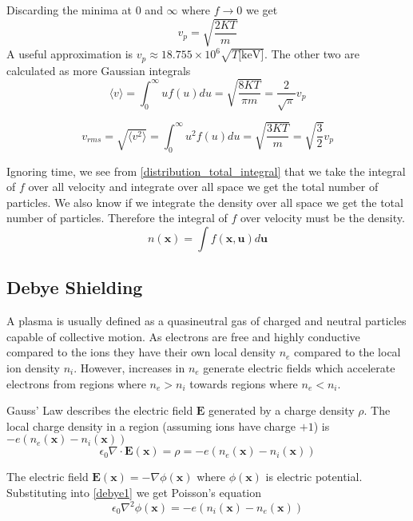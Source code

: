 Discarding the minima at 0 and $\infty$ where $f \rightarrow 0$ we get
\begin{equation}
	v_p=\sqrt{\frac{2KT}{m}}
\end{equation}
A useful approximation is $v_p \approx 18.755 \times 10^6 \sqrt{T\text{[keV]}}$. The other two are calculated as more Gaussian integrals
\begin{equation}
	\langle v \rangle = \int_{0}^{\infty}uf(u)du=\sqrt{\frac{8KT}{\pi m}} = \frac{2}{\sqrt{\pi}}v_p
\end{equation}

\begin{equation}
	v_{rms} = \sqrt{\langle v^2 \rangle} = \int_{0}^{\infty}u^2f(u)du = \sqrt{\frac{3KT}{m}} = \sqrt{\frac{3}{2}}v_p
\end{equation}

Ignoring time, we see from \eqref{distribution_total_integral} that we take the integral of $f$ over all velocity and integrate over all space we get the total number of particles. We also know if we integrate the density over all space we get the total number of particles. Therefore the integral of $f$ over velocity must be the density.
\begin{equation}
	n(\bm{x}) = \int f(\bm{x}, \bm{u}) d\bm{u}
\end{equation}

\subsection{Debye Shielding}
A plasma is usually defined as a quasineutral gas of charged and neutral particles capable of collective motion. As electrons are free and highly conductive compared to the ions they have their own local density $n_e$ compared to the local ion density $n_i$. However, increases in $n_e$ generate electric fields which accelerate electrons from regions where $n_e > n_i$ towards regions where $n_e < n_i$.

Gauss' Law describes the electric field $\textbf{E}$ generated by a charge density $\rho$. The local charge density in a region (assuming ions have charge $+1$) is $-e(n_e(\textbf{x})-n_i(\textbf{x}))$
\begin{equation}\label{debye1}
	\epsilon_0\nabla\cdot\bm{E}(\bm{x}) = \rho = -e(n_e(\bm{x})-n_i(\bm{x}))
\end{equation}

The electric field $\textbf{E}(\textbf{x})=-\nabla \phi(\textbf{x})$ where $\phi(\textbf{x})$ is electric potential. Substituting into \eqref{debye1} we get Poisson's equation
\begin{equation}\label{debye2}
	\epsilon_0 \nabla^2 \phi(\bm{x}) = -e(n_i(\bm{x})-n_e(\bm{x}))
\end{equation}

